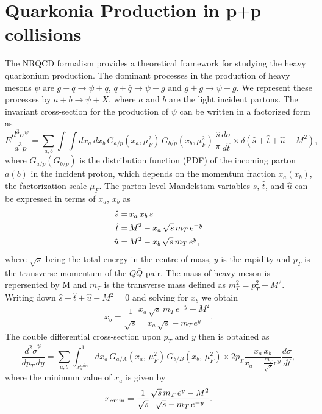 \documentclass[aps,prc,preprint,superscriptaddress,showpacs,showkeys,amsmath]{revtex4-1}
\begin{document}
\section{Quarkonia Production in p$+$p collisions}
\label{section:ppProduction}
 The NRQCD formalism provides a theoretical framework for studying the heavy 
quarkonium production. The dominant processes in the production of heavy 
mesons $\psi$ are $g+q\rightarrow \psi+q$, $q+\bar{q}\rightarrow \psi+g$ and 
$g+g\rightarrow \psi+g$. We represent these processes by $a+b\rightarrow \psi+X$, 
where $a$ and $b$ are the light incident partons. The invariant cross-section 
for the production of $\psi$ can be written in a factorized form as 
\begin{equation}
    E\frac{d^{3}\sigma^{\psi}}{d^{3}p} = \sum_{a,b}\int \int dx_a\,dx_b \, 
    G_{a/p}(x_a,\mu_{F}^{2}) \, G_{b/p}(x_b,\mu_{F}^{2}) \, \frac{\hat s}{\pi}\frac{d\sigma}{d\hat t}
    \times \delta(\hat s + \hat t + \hat u -M^{2}), 
\label{eqn:cross}
\end{equation}
where $G_{a/p}(G_{b/p})$ is the distribution function (PDF) of the incoming parton 
$a(b)$ in the incident proton, which depends on the momentum fraction $x_a(x_b)$, 
the factorization scale $\mu_F$. The parton level  Mandelstam variables 
${\hat s}$, ${\hat t}$, and ${\hat u}$
can be expressed in terms of $x_a$, $x_b$ as 
\begin{equation}
\begin{split}
{\hat{s}} = \,& x_{a}\,x_{b}\,s \\
{\hat{t}} = \,& M^{2} - x_{a}\,\sqrt{s}\,m_{T}\,e^{-y}\\
{\hat{u}} = \,& M^{2} - x_{b}\,\sqrt{s}\,m_{T}\,e^{y} ,
\end{split}  
\end{equation}
where $\sqrt{s}$ being the total energy in the centre-of-mass, $y$ is the rapidity 
and $p_{T}$ is the transverse momentum of the $Q\bar Q$ pair. The mass of heavy
meson is repersented by M and $m_{T}$ is the transverse mass 
defined as $m_{T}^{2} = p_{T}^{2} + M^{2}$. Writing 
down $ \hat s + \hat t + \hat u -M^{2} = 0$ and solving for $x_{b}$ we obtain
\begin{equation}
x_b = \frac{1}{\sqrt{s}}\frac{x_a\,\sqrt{s}\,m_T\,e^{-y}-M^2}{x_a\,\sqrt{s}-m_T\,e^y}.
\end{equation}
 The double differential cross-section upon $p_{T}$ and $y$ then is obtained as
\begin{equation}
\frac{{d^{2}\sigma}^{\psi}}{dp_T\,dy} = \sum_{a,b}\int_{x_{a}^{min}}^{1} dx_a\, 
           G_{a/A}(x_a,\,\mu^{2}_{F})\, G_{b/B}(x_b,\,\mu^{2}_{F})\times 
            2p_T \frac{x_a\,x_b}{x_a-\frac{m_T}{\sqrt{s}}e^y}\frac{d\sigma}{d\hat t},
\end{equation}
where the minimum value of $x_a$ is given by
\begin{equation}
x_{a\rm min} = \frac{1}{\sqrt{s}}\frac{\sqrt{s}\,m_T\,e^{y}-M^2}{\sqrt{s}-m_T\,e^{-y}}.
\end{equation}
\end{document}

